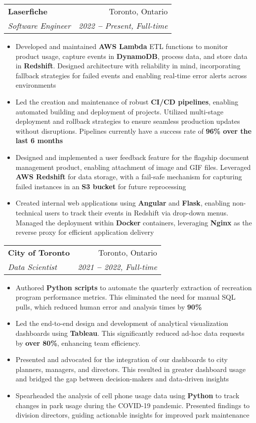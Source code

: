 \documentclass[letterpaper,10pt]{article}
\makeatletter
\newcommand{\resumeItem}[1]{
  \item\small{
    {#1 \vspace{-2pt}}
  }
}
\newcommand{\resumeSubheading}[4]{
  \vspace{-2pt}\item
    \begin{tabular*}{0.97\textwidth}[t]{l@{\extracolsep{\fill}}r}
      \textbf{#1} & #2 \\
      \textit{\small#3} & \textit{\small #4} \\
    \end{tabular*}\vspace{-7pt}
}
\newcommand{\resumeItemListStart}{\begin{itemize}}
\newcommand{\resumeItemListEnd}{\end{itemize}\vspace{-5pt}}
\makeatother
\begin{document}
    \resumeSubheading
      {Laserfiche}{Toronto, Ontario}
      {Software Engineer}{2022 \textbf{--} Present, Full-time}
        \resumeItemListStart
            \resumeItem{Developed and maintained \textbf{AWS Lambda} ETL
            functions to monitor product usage, capture events in
            \textbf{DynamoDB}, process data, and store data in
            \textbf{Redshift}. Designed architecture with reliability in mind,
            incorporating fallback strategies for failed events and enabling
            real-time error alerts across environments}
            \resumeItem{Led the creation and maintenance of robust
            \textbf{CI/CD pipelines}, enabling automated building and
            deployment of projects. Utilized multi-stage deployment and
            rollback strategies to ensure seamless production updates without
            disruptions. Pipelines currently have a success rate of
            \textbf{96\% over the last 6 months}}
            \resumeItem{Designed and implemented a user feedback feature for
            the flagship document management product, enabling attachment of
            image and GIF files. Leveraged \textbf{AWS Redshift} for data
            storage, with a fail-safe mechanism for capturing failed instances
            in an \textbf{S3 bucket} for future reprocessing}
            \resumeItem{Created internal web applications using
            \textbf{Angular} and \textbf{Flask}, enabling non-technical users
            to track their events in Redshift via drop-down menus. Managed the
            deployment within \textbf{Docker} containers, leveraging
            \textbf{Nginx} as the reverse proxy for efficient application
            delivery}
        \resumeItemListEnd


    \resumeSubheading
      {City of Toronto}{Toronto, Ontario}
      {Data Scientist}{2021 \textbf{--} 2022, Full-time}
        \resumeItemListStart
            \resumeItem{Authored \textbf{Python scripts} to automate the
            quarterly extraction of recreation program performance metrics.
            This eliminated the need for manual SQL pulls, which reduced human
            error and analysis times by \textbf{90\%}}
            \resumeItem{Led the end-to-end design and development of analytical
            visualization dashboards using \textbf{Tableau}. This significantly
            reduced ad-hoc data requests by \textbf{over 80\%}, enhancing team
            efficiency.}
            \resumeItem{Presented and advocated for the integration of our
            dashboards to city planners, managers, and directors. This resulted
            in greater dashboard usage and bridged the gap between
            decision-makers and data-driven insights}
            \resumeItem{Spearheaded the analysis of cell phone usage data using
            \textbf{Python} to track changes in park usage during the COVID-19
            pandemic. Presented findings to division directors, guiding
            actionable insights for improved park maintenance}
        \resumeItemListEnd
    
\end{document}
